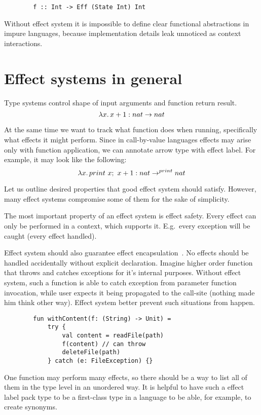 \documentclass[conference]{IEEEtran}
\newcommand{\seq}{;~}
\newcommand{\ap}{~}
\begin{document}
    \begin{verbatim}
        f :: Int -> Eff (State Int) Int
    \end{verbatim}

    Without effect system it is impossible to define clear functional abstractions in impure languages, because implementation details leak unnoticed as context interactions.


    \section{Effect systems in general}

    Type systems control shape of input arguments and function return result.
    \[\lambda x\ldotp x + 1 : nat\to nat\]

    At the same time we want to track what function does when running, specifically what effects it might perform.
    Since in call-by-value languages effects may arise only with function application, we can annotate arrow type with effect label.
    For example, it may look like the following:
    \[\lambda x\ldotp print \ap x\seq x + 1 : nat\to^{print} nat\]

    Let us outline desired properties that good effect system should satisfy.
    However, many effect systems compromise some of them for the sake of simplicity.

    The most important property of an effect system is effect safety.
    Every effect can only be performed in a context, which supports it.
    E.g.\ every exception will be caught (every effect handled).

    Effect system should also guarantee effect encapsulation~\cite{encapsulation}.
    No effects should be handled accidentally without explicit declaration.
    Imagine higher order function that throws and catches exceptions for it's internal purposes.
    Without effect system, such a function is able to catch exception from parameter function invocation, while user expects it being propagated to the call-site (nothing made him think other way).
    Effect system better prevent such situations from happen.
    \begin{verbatim}
        fun withContent(f: (String) -> Unit) =
            try {
                val content = readFile(path)
                f(content) // can throw
                deleteFile(path)
            } catch (e: FileException) {}
    \end{verbatim}

    One function may perform many effects, so there should be a way to list all of them in the type level in an unordered way.
    It is helpful to have such a effect label pack type to be a first-class type in a language to be able, for example, to create synonyms.
\end{document}
